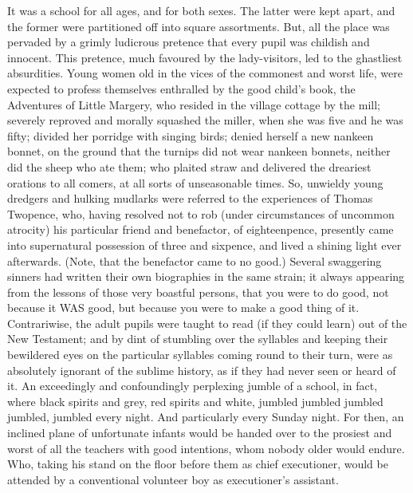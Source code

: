 It was a school for all ages, and for both sexes. The latter were kept
apart, and the former were partitioned off into square assortments. But,
all the place was pervaded by a grimly ludicrous pretence that every
pupil was childish and innocent. This pretence, much favoured by the
lady-visitors, led to the ghastliest absurdities. Young women old in
the vices of the commonest and worst life, were expected to profess
themselves enthralled by the good child’s book, the Adventures of
Little Margery, who resided in the village cottage by the mill; severely
reproved and morally squashed the miller, when she was five and he was
fifty; divided her porridge with singing birds; denied herself a new
nankeen bonnet, on the ground that the turnips did not wear nankeen
bonnets, neither did the sheep who ate them; who plaited straw and
delivered the dreariest orations to all comers, at all sorts of
unseasonable times. So, unwieldy young dredgers and hulking mudlarks
were referred to the experiences of Thomas Twopence, who, having
resolved not to rob (under circumstances of uncommon atrocity) his
particular friend and benefactor, of eighteenpence, presently came into
supernatural possession of three and sixpence, and lived a shining light
ever afterwards. (Note, that the benefactor came to no good.) Several
swaggering sinners had written their own biographies in the same strain;
it always appearing from the lessons of those very boastful persons,
that you were to do good, not because it WAS good, but because you were
to make a good thing of it. Contrariwise, the adult pupils were taught
to read (if they could learn) out of the New Testament; and by dint of
stumbling over the syllables and keeping their bewildered eyes on the
particular syllables coming round to their turn, were as absolutely
ignorant of the sublime history, as if they had never seen or heard of
it. An exceedingly and confoundingly perplexing jumble of a school,
in fact, where black spirits and grey, red spirits and white, jumbled
jumbled jumbled jumbled, jumbled every night. And particularly every
Sunday night. For then, an inclined plane of unfortunate infants would
be handed over to the prosiest and worst of all the teachers with good
intentions, whom nobody older would endure. Who, taking his stand on
the floor before them as chief executioner, would be attended by a
conventional volunteer boy as executioner’s assistant. 

